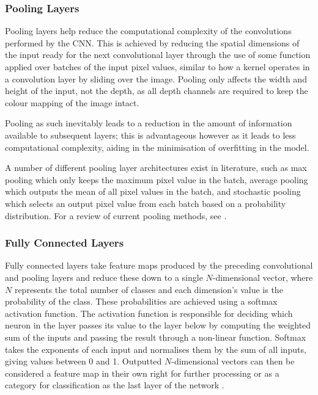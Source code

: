 \subsubsection{Pooling Layers}\label{ch:Background,sec:CNN,sub:CNN,subsubsec:pooling}

Pooling layers help reduce the computational complexity of the convolutions performed by the CNN. This is achieved by reducing the spatial dimensions of the input ready for the next convolutional layer through the use of some function applied over batches of the input pixel values, similar to how a kernel operates in a convolution layer by sliding over the image. Pooling only affects the width and height of the input, not the depth, as all depth channels are required to keep the colour mapping of the image intact. 

Pooling as such inevitably leads to a reduction in the amount of information available to subsequent layers; this is advantageous however as it leads to less computational complexity, aiding in the minimisation of overfitting in the model. 

A number of different pooling layer architectures exist in literature, such as max pooling which only keeps the maximum pixel value in the batch, average pooling \cite{boureau_theoretical_2010} which outputs the mean of all pixel values in the batch, and stochastic pooling \cite{zeiler_stochastic_2013} which selects an output pixel value from each batch based on a probability distribution. For a review of current pooling methods, see \cite{gholamalinezhad_pooling_2020}.

\subsubsection{Fully Connected Layers}\label{ch:Background,sec:CNN,sub:CNN,subsubsec:fullyConnected}

Fully connected layers take feature maps produced by the preceding convolutional and pooling layers and reduce these down to a single $N$-dimensional vector, where $N$ represents the total number of classes and each dimension's value is the probability of the class. These probabilities are achieved using a softmax activation function. The activation function is responsible for deciding which neuron in the layer passes its value to the layer below by computing the weighted sum of the inputs and passing the result through a non-linear function. Softmax takes the exponents of each input and normalises them by the sum of all inputs, giving values between 0 and 1. Outputted $N$-dimensional vectors can then be considered a feature map in their own right for further processing \cite{krizhevsky_imagenet_2012} or as a category for classification as the last layer of the network \cite{girshick_rich_2014}.

